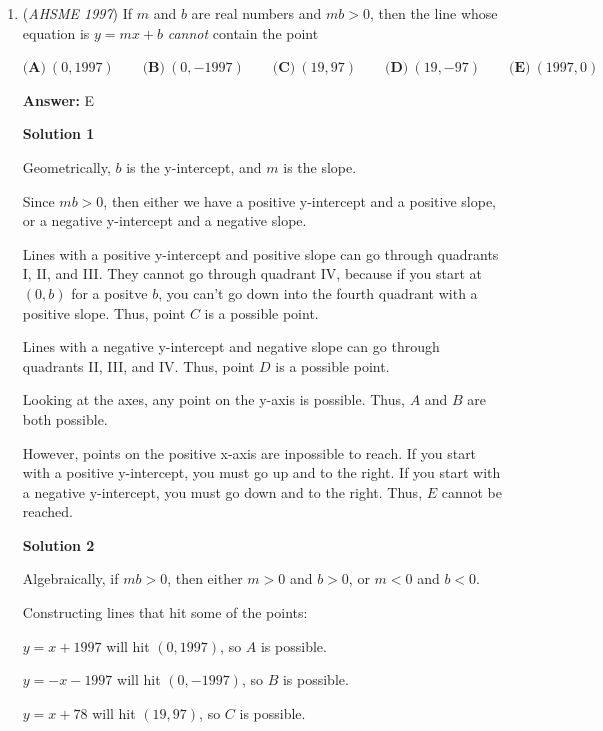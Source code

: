 \begin{enumerate}
 Thus, the tenth game must have at least $113 - 84 = 29$ points, and the answer is $\boxed{D}$.

 


	\item (\textit{AHSME 1997}) If $m$ and $b$ are real numbers and $mb>0$, then the line whose equation is $y=mx+b$ \textit{cannot} contain the point


 $\textbf{(A)}\ (0,1997)\qquad\textbf{(B)}\ (0,-1997)\qquad\textbf{(C)}\ (19,97)\qquad\textbf{(D)}\ (19,-97)\qquad\textbf{(E)}\ (1997,0)$

 \textbf{Answer: }E



\textbf{Solution 1}

Geometrically, $b$ is the y-intercept, and $m$ is the slope.

 Since $mb>0$, then either we have a positive y-intercept and a positive slope, or a negative y-intercept and a negative slope.

 Lines with a positive y-intercept and positive slope can go through quadrants I, II, and III.  They cannot go through quadrant IV, because if you start at $(0,b)$ for a positve $b$, you can't go down into the fourth quadrant with a positive slope.  Thus, point $C$ is a possible point.

 Lines with a negative y-intercept and negative slope can go through quadrants II, III, and IV.  Thus, point $D$ is a possible point.

 Looking at the axes, any point on the y-axis is possible.  Thus, $A$ and $B$ are both possible.

 However, points on the positive x-axis are inpossible to reach.  If you start with a positive y-intercept, you must go up and to the right.  If you start with a negative y-intercept, you must go down and to the right.  Thus, $\boxed{E}$ cannot be reached.

 



\textbf{Solution 2}

Algebraically, if $mb > 0$, then either $m>0$ and $b>0$, or $m<0$ and $b<0$.

 Constructing lines that hit some of the points:

 $y = x + 1997$ will hit $(0,1997)$, so $A$ is possible.

 $y = -x - 1997$ will hit $(0,-1997)$, so $B$ is possible.

 $y = x + 78$ will hit $(19,97)$, so $C$ is possible.


\end{enumerate}
